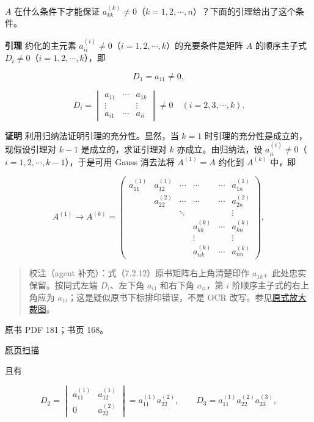 \documentclass[
  10pt,
  fontset=fandol]{ctexart}
\begin{document}
\(A\) 在什么条件下才能保证 \(a_{kk}^{(k)}\ne0\)（\(k=1,2,\cdots,n\)）？下面的引理给出了这个条件。

\textbf{引理} 约化的主元素 \(a_{ii}^{(i)}\ne0\)（\(i=1,2,\cdots,k\)）的充要条件是矩阵 \(A\) 的顺序主子式 \(D_i\ne0\)（\(i=1,2,\cdots,k\)），即

\[D_1=a_{11}\ne0,\]

\[
D_i=\begin{vmatrix}
a_{11}&\cdots&a_{1k}\\
\vdots&&\vdots\\
a_{i1}&\cdots&a_{ii}
\end{vmatrix}\ne0\quad(i=2,3,\cdots,k).
\tag{7.2.12}
\]

\textbf{证明} 利用归纳法证明引理的充分性。显然，当 \(k=1\) 时引理的充分性是成立的，现假设引理对 \(k-1\) 是成立的，求证引理对 \(k\) 亦成立。由归纳法，设 \(a_{ii}^{(i)}\ne0\)（\(i=1,2,\cdots,k-1\)），于是可用 Gauss 消去法将 \(A^{(1)}=A\) 约化到 \(A^{(k)}\) 中，即

\[
A^{(1)}\to A^{(k)}=\begin{pmatrix}
a_{11}^{(1)}&a_{12}^{(1)}&\cdots&\cdots&\cdots&a_{1n}^{(1)}\\
&a_{22}^{(2)}&\cdots&\cdots&\cdots&a_{2n}^{(2)}\\
&&\ddots&&&\vdots\\
&&&a_{kk}^{(k)}&\cdots&a_{kn}^{(k)}\\
&&&\vdots&&\vdots\\
&&&a_{nk}^{(k)}&\cdots&a_{nn}^{(k)}
\end{pmatrix},
\]

\begin{quote}
校注（agent 补充）：式（7.2.12）原书矩阵右上角清楚印作 \(a_{1k}\)，此处忠实保留。按同式左端 \(D_i\)、左下角 \(a_{i1}\) 和右下角 \(a_{ii}\)，第 \(i\) 阶顺序主子式的右上角应为 \(a_{1i}\)；这是疑似原书下标排印错误，不是 OCR 改写。参见\href{../../../staging/ch07a/assets/pdf-180-principal-minor-detail.png}{原式放大裁图}。
\end{quote}

\clearpage

原书 PDF 181；书页 168。

\href{../../../source-images/pdf-181.jpeg}{原页扫描}

且有

\[
D_2=\begin{vmatrix}a_{11}^{(1)}&a_{12}^{(1)}\\0&a_{22}^{(2)}\end{vmatrix}
=a_{11}^{(1)}a_{22}^{(2)},\qquad
D_3=a_{11}^{(1)}a_{22}^{(2)}a_{33}^{(3)},
\]
\end{document}

